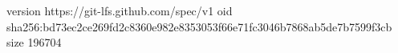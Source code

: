 version https://git-lfs.github.com/spec/v1
oid sha256:bd73ec2ce269fd2c8360e982e8353053f66e71fc3046b7868ab5de7b7599f3cb
size 196704

